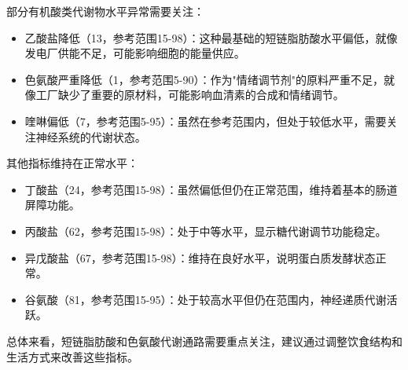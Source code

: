 \documentclass[UTF8]{ctexart}
\begin{document}
\begin{tcolorbox}[
    enhanced,
    colback=gray!3,
    colframe=gray!3,
    arc=3mm,
    boxrule=0pt,
    width=\textwidth,
    top=8pt,
    bottom=8pt
]
{\small{\textcolor{yellow!85!orange}{\faLightbulb}}\quad 部分有机酸类代谢物水平异常需要关注：
\begin{itemize}
    \item 乙酸盐降低（13，参考范围15-98）：这种最基础的短链脂肪酸水平偏低，就像发电厂供能不足，可能影响细胞的能量供应。
    \item 色氨酸严重降低（1，参考范围5-90）：作为"情绪调节剂"的原料严重不足，就像工厂缺少了重要的原材料，可能影响血清素的合成和情绪调节。
    \item 喹啉偏低（7，参考范围5-95）：虽然在参考范围内，但处于较低水平，需要关注神经系统的代谢状态。
\end{itemize}

{\textcolor{green!85!orange}{\faLightbulb}}\quad 其他指标维持在正常水平：
\begin{itemize}
    \item 丁酸盐（24，参考范围15-98）：虽然偏低但仍在正常范围，维持着基本的肠道屏障功能。
    \item 丙酸盐（62，参考范围15-98）：处于中等水平，显示糖代谢调节功能稳定。
    \item 异戊酸盐（67，参考范围15-98）：维持在良好水平，说明蛋白质发酵状态正常。
    \item 谷氨酸（81，参考范围15-95）：处于较高水平但仍在范围内，神经递质代谢活跃。
\end{itemize}

总体来看，短链脂肪酸和色氨酸代谢通路需要重点关注，建议通过调整饮食结构和生活方式来改善这些指标。
}

\end{tcolorbox}

\newpage
\end{document}
